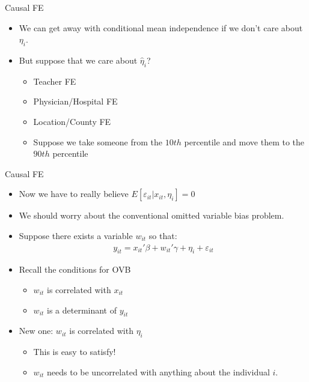 \documentclass[xcolor=pdftex,dvipsnames,table,mathserif,aspectratio=169]{beamer}
\begin{document}
\begin{frame}{Causal FE}
\begin{itemize}
\item We can get away with conditional mean independence if we don't care about $\eta_i$.
\item But suppose that we care about $\widehat{\eta}_i$?
\begin{itemize}
\item Teacher FE
\item Physician/Hospital FE
\item Location/County FE
\item Suppose we take someone from the $10th$ percentile and move them to the $90th$ percentile
\end{itemize}
\end{itemize}
\end{frame}


\begin{frame}{Causal FE}
\begin{itemize}
\item Now we have to really believe $E[ \varepsilon_{it} | x_{it}, \eta_i]=0$
\item We should worry about the conventional \alert{omitted variable bias} problem.
\item Suppose there exists a variable $w_{it}$ so that:
\begin{eqnarray*}
y_{it} =  x_{it}'\beta +  w_{it}'\gamma + \eta_i + \varepsilon_{it}
\end{eqnarray*}
\item Recall the conditions for OVB
\begin{itemize}
\item $w_{it}$ is correlated with $x_{it}$
\item $w_{it}$ is a determinant of $y_{it}$
\end{itemize}
\item New one:  $w_{it}$ is correlated with $\eta_i$
\begin{itemize}
\item This is easy to satisfy!
\item $w_{it}$ needs to be uncorrelated with anything about the individual $i$.
\end{itemize}
\end{itemize}
\end{frame}
\end{document}
